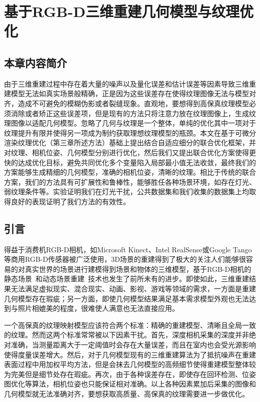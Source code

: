 
\chapter{基于RGB-D三维重建几何模型与纹理优化}
\section{本章内容简介}

由于三维重建过程中存在着大量的噪声以及量化误差和估计误差等因素导致三维重建模型无法如真实场景般精确，正是因为这些误差存在使得纹理图像无法与模型对齐，造成不可避免的模糊伪影或者裂缝现象。直观地，要想得到高保真纹理模型必须消除或者矫正这些误差项，但是现有的方法只将注意力放在纹理图像上，生成纹理图像以适配几何模型。忽略了几何与纹理是一个整体，单纯的优化其中一项对于纹理提升有限并使得另一项成为制约获取理想纹理模型的瓶颈。本文在基于可微分渲染纹理优化（第三章所述方法）基础上提出结合自适应细分的联合优化框架，并对纹理、相机位姿、几何模型分别进行优化，然后我们又提出联合优化方案使得更快的达成优化目标，避免共同优化多个变量陷入局部最小值无法收敛，最终我们的方案能够生成精细的几何模型，准确的相机位姿，清晰的纹理。相比于传统的联合方案，我们的方法具有可扩展性和鲁棒性，能够胜任各种场景环境，如存在灯光、弱纹理条件等。实验证明我们在灯光干扰，公共数据集和我们收集的数据集上均取得良好的表现证明了我们方法的有效性。

\section{引言}


得益于消费机RGB-D相机，如Microsoft Kinect、Intel RealSense或Google Tango等商用RGB-D传感器被广泛使用，3D场景的重建得到了极大的关注人们能够很容易的对真实世界的场景进行建模得到场景和物体的三维模型，基于RGB-D相机的静态场景~\cite{RichardNewcombe2011KinectFusionRD,ThomasWhelan2012KintinuousSE,ThomasWhelan2015ElasticFusionDS,SungjoonChoi2015RobustRO,VictorAdrianPrisacariu2017InfiniTAMVA,AngelaDai2016BundleFusionRG}和动态场景重建~\cite{newcombe2015dynamicfusion,innmann2016volumedeform,yu2017bodyfusion,yu2018doublefusion,xu2019unstructuredfusion,su2020robustfusion,slavcheva2017killingfusion,gao2019surfelwarp,dou2016fusion4d}技术也发生了前所未有的进步。即使如此，三维重建结果无法满足虚拟现实、混合现实、动画、影视、游戏等领域的需求，一方面是重建几何模型存在瑕疵；另一方面，即使几何模型结果满足基本需求模型外观也无法达到与照片相媲美的程度，很难使人满意也无法直接应用。\par

一个高保真的纹理映射模型应该符合两个标准：精确的重建模型、清晰且全局一致的纹理。然而这两个标准常常被以下因素干扰。首先，深度相机采集的深度并非绝对准确，当测量距离大于一定阈值时会存在大量误差，而且在室内也会受光源影响使得度量误差增大。然后，对于几何模型现有的三维重建算法为了抵抗噪声在重建表面过程中用加权平均方法，但是会抹去几何模型的高频细节使得重建模型整体较为完美但是细节处存在瑕疵。再次，由于各种误差存在，即使存在回环检测、位姿图优化等算法，相机位姿也只能保证相对准确。以上各种因素累加后采集的图像和几何模型就无法准确对齐，要想获取高质量、高保真的纹理需要进一步做优化。\par



